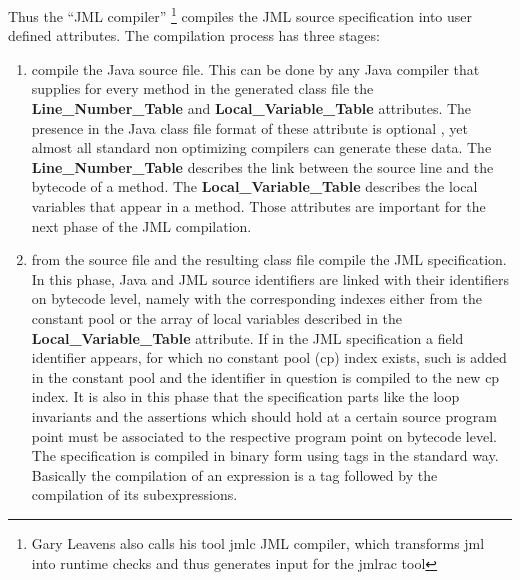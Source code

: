 Thus the ``JML compiler'' \footnote{Gary Leavens also calls his tool jmlc JML compiler, which transforms jml into runtime checks and thus generates input for the jmlrac tool  } compiles the JML source specification into user defined attributes. The compilation process has three stages:
\begin{enumerate}
\item compile the Java source file. This can be done by any Java compiler that supplies for every method in the generated class file 
the \textbf{Line\_Number\_Table} and \textbf{Local\_Variable\_Table}  attributes. The presence in the Java class file format of 
these attribute is optional \cite{VMSpec}, yet almost all standard non optimizing compilers can generate these data. 
The \textbf{Line\_Number\_Table} describes the link between the source line and the bytecode of a method.  
The \textbf{Local\_Variable\_Table} describes the local variables that appear in a method. 
Those attributes are important for the next phase of the JML compilation.
\item from the source file and the resulting class file compile the JML specification. In this phase, Java and JML source identifiers are 
linked with their identifiers on bytecode level, namely with the corresponding indexes either from the constant pool or the array of 
local variables described in the \textbf{Local\_Variable\_Table} attribute. If in the JML specification a field
identifier appears, for which no constant pool (cp) index exists, such is added in the constant pool and the identifier in question
is compiled to the new cp index. It is also in this phase that the specification parts like the loop invariants and the assertions which should hold at a certain source program point must be associated to the respective program point on bytecode level. The specification
is compiled in binary form using tags in the standard way. Basically the compilation of an expression is a tag followed by the compilation of its subexpressions. 



\end{enumerate}
